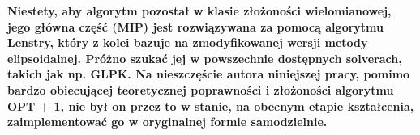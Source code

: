 \textbf{Niestety, aby algorytm pozostał w klasie złożoności wielomianowej, jego główna część (MIP) jest rozwiązywana za pomocą algorytmu Lenstry, który z kolei bazuje na zmodyfikowanej wersji metody elipsoidalnej. Próżno szukać jej w powszechnie dostępnych solverach, takich jak np. GLPK.
Na nieszczęście autora niniejszej pracy, pomimo bardzo obiecującej teoretycznej poprawności i złożoności algorytmu OPT + 1, nie był on przez to w stanie, na obecnym etapie kształcenia, zaimplementować go w oryginalnej formie samodzielnie.}  


